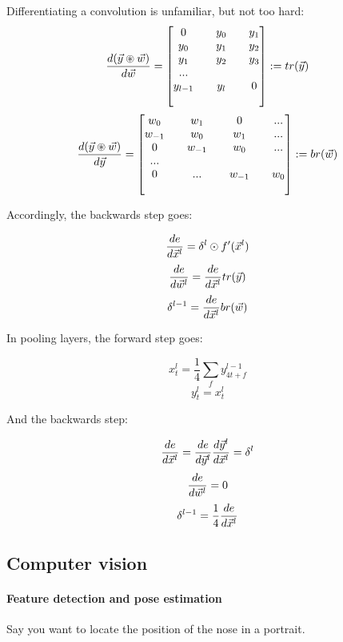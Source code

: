 Differentiating a convolution is unfamiliar, but not too hard: 
$$  \frac{ \mathop{d(\vec{y} \circledast \vec{w})} }{ \mathop{d\vec{w}} }  =  \begin{bmatrix} 
	0   && y_0 && y_1 \\
	y_0 && y_1 && y_2 \\
	y_1 && y_2 && y_3 \\
	... \\
	y_{l-1} && y_l && 0 \\
 \\ \end{bmatrix}  := tr(\vec{y}) $$
$$  \frac{ \mathop{d(\vec{y} \circledast \vec{w})} }{ \mathop{d\vec{y}} }  =  \begin{bmatrix} 
	w_0    && w_1    && 0   && ... \\
	w_{-1} && w_0    && w_1 && ... \\
	0      && w_{-1} && w_0 && ... \\
	...    \\
	0      && ...    && w_{-1} && w_0 \\
 \\ \end{bmatrix}  := br(\vec{w}) $$



Accordingly, the backwards step goes:

$$  \frac{ \mathop{de} }{ \mathop{d\vec{x}^l} }  = \delta^l \odot f'(\vec{x}^l) $$
$$  \frac{ \mathop{de} }{ \mathop{d\vec{w}^l} }  =  \frac{ \mathop{de} }{ \mathop{d\vec{x}^l} }  tr(\vec{y}) $$
$$ \delta^{l-1} =  \frac{ \mathop{de} }{ \mathop{d\vec{x}^l} }  br(\vec{w}) $$

In pooling layers, the forward step goes: 

$$ x_t^l = \frac{1}{4} \sum_f y_{4t + f}^{l-1} $$
$$ y_t^l = x_t^l $$

And the  backwards step: 

$$  \frac{ \mathop{de} }{ \mathop{d\vec{x}^l} }  =  \frac{ \mathop{de} }{ \mathop{d\vec{y}^l} }   \frac{ \mathop{d\vec{y}^l} }{ \mathop{d\vec{x}^l} }   = \delta^l  $$
$$  \frac{ \mathop{de} }{ \mathop{d\vec{w}^l} }  = 0 $$
$$ \delta^{l-1} = \frac{1}{4}  \frac{ \mathop{de} }{ \mathop{d\vec{x}^l} }   $$

\subsection{Computer vision}

\paragraph{Feature detection and pose estimation}

Say you want to locate the position of the nose in a portrait. 
